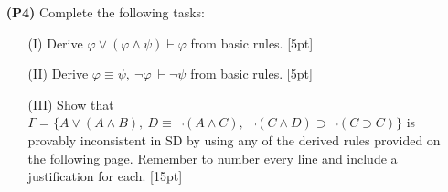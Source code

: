 \documentclass[12pt]{article}
\newcommand{\set}[1]{\lbrace#1\rbrace} %
\def\eand{\ensuremath{\,\&\,}}
\def\eiff{\ensuremath{\equiv}}
\def\enot{\ensuremath{{\sim}}} %
\let\oldsim\sim %
\renewcommand{\sim}{{\oldsim}} %
\def\metaA{\ensuremath{\varPhi}}
\def\metaB{\ensuremath{\varPsi}}
\begin{document}
\begin{enumerate}
%
%
%
%
%
%
%
%
%

\item[\bf (P4)] Complete the following tasks:
  \begin{itemize}
    \item[(I)] Derive $\varphi\vee(\varphi\wedge\psi) \vdash \varphi$ from basic rules. [5pt]
    \item[(II)] Derive $\varphi \equiv \psi,\ \neg\varphi\ \vdash \neg\psi$ from basic rules. [5pt]
    \item[(III)] Show that $\Gamma = \set{ A\vee(A\wedge B),\ D \equiv \neg(A\wedge C),\ \neg (C \wedge D) \supset \neg(C \supset C) }$ is provably inconsistent in SD by using any of the derived rules provided on the following page. 
      Remember to number every line and include a justification for each.
      [15pt]
  \end{itemize}
\end{enumerate}

\newpage
\end{document}
